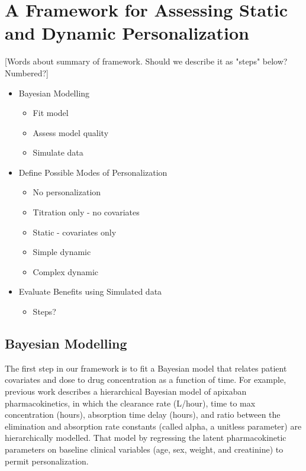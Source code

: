 \section{A Framework for Assessing Static and Dynamic Personalization}\label{ss:framework}

[Words about summary of framework. Should we describe it as "steps" below? Numbered?]

\begin{itemize}
\item Bayesian Modelling
\begin{itemize}
	\item Fit model
	\item Assess model quality
	\item Simulate data
\end{itemize}
\item Define Possible Modes of Personalization
\begin{itemize}
	\item No personalization
	\item Titration only - no covariates
	\item Static - covariates only
	\item Simple dynamic
	\item Complex dynamic
\end{itemize}
\item Evaluate Benefits using Simulated data
\begin{itemize}
\item Steps?
\end{itemize}
\end{itemize}

\subsection{Bayesian Modelling}

The first step in our framework is to fit a Bayesian model that relates patient covariates and dose to drug concentration as a function of time. For example, previous work \cite{pananos2020comparisons} describes a hierarchical Bayesian model of apixaban pharmacokinetics, in which the clearance rate (L/hour), time to max concentration (hours), absorption time delay (hours), and ratio between the elimination and absorption rate constants (called alpha, a unitless parameter) are hierarchically modelled.  That model by regressing the latent pharmacokinetic parameters on baseline clinical variables (age, sex, weight, and creatinine) to permit personalization.

